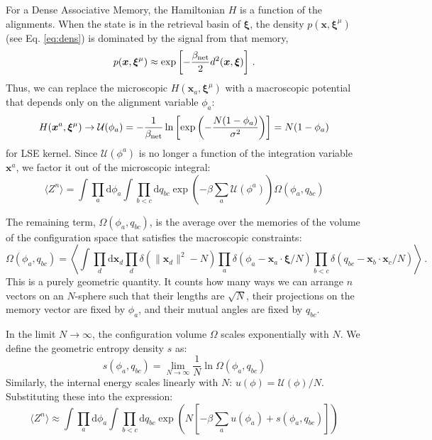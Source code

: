 \documentclass{article}
\newcommand{\dd}{{\mathrm{d}}}
\theoremstyle{plain}
\theoremstyle{definition}
\theoremstyle{remark}
\begin{document}
For a Dense Associative Memory, the Hamiltonian $H$ is a function of the alignments. When the state is in the retrieval basin of $\bm{\xi}$, the density $p(\bm{x}, \bm{\xi}^\mu)$ (see Eq. \ref{eq:dens}) is dominated by the signal from that memory,
\begin{equation}
    p(\bm{x}, \bm{\xi}^\mu) \approx \exp\left[ - \frac{\beta_{\rm net}}{2} d^2(\bm{x}, \bm{\xi}) \right] \,.
    \label{eq:dens_red}    
\end{equation}
Thus, we can replace the microscopic $H(\bm{x}_a, \bm{\xi}^\mu)$ with a macroscopic potential that depends only on the alignment variable $\phi_a$:
\begin{equation}
    H(\bm{x}^a, \bm{\xi}^\mu) \to \mathcal{U}(\phi_a) = -\frac{1}{\beta_{\rm net}} \ln \left[  \exp\left( -\frac{N(1 - \phi_a)}{\sigma^2} \right) \right] = N(1-\phi_a)
\end{equation}
for LSE kernel. Since $\mathcal{U}(\phi^a)$ is no longer a function of the integration variable $\bm{x}^a$, we factor it out of the microscopic integral:
\begin{equation}
    \langle Z^n \rangle = \int \prod_a \dd \phi_a \int \prod_{b<c}  \dd q_{bc} \exp\left(-\beta \sum_a \mathcal{U}(\phi^a)\right)  \Omega(\phi_a, q_{bc})
\end{equation}


The remaining term, $\Omega(\phi_a, q_{bc})$, is the average over the memories of the volume of the configuration space that satisfies the macroscopic constraints:
\begin{equation}
\Omega(\phi_a, q_{bc}) = \left\langle \int \prod_d \dd \bm{x}_d \prod_d \delta(\|\bm{x}_d\|^2 - N) \prod_a \delta(\phi_a - \bm{x}_a \cdot \bm{\xi}/N) \prod_{b<c} \delta(q_{bc} - \bm{x}_b \cdot \bm{x}_c/N) \right\rangle\,.
\end{equation}
This is a purely geometric quantity. It counts how many ways we can arrange $n$ vectors on an $N$-sphere such that their lengths are $\sqrt{N}$, their projections on the memory vector are fixed by $\phi_a$, and their mutual angles are fixed by $q_{bc}$.

In the limit $N \to \infty$, the configuration volume $\Omega$ scales exponentially with $N$. We define the geometric entropy density $s$ as:
$$s(\phi_a, q_{bc}) = \lim_{N \to \infty} \frac{1}{N} \ln \Omega(\phi_a, q_{bc})$$
Similarly, the internal energy scales linearly with $N$: $u(\phi) = \mathcal{U}(\phi)/N$. Substituting these into the expression:
\begin{equation}
    \langle Z^n \rangle \approx \int \prod_a \dd \phi_a \int \prod_{b<c}  \dd q_{bc} \exp\left( N \left[ -\beta \sum_a u(\phi_a) + s(\phi_a, q_{bc}) \right] \right)
\end{equation}
\end{document}

